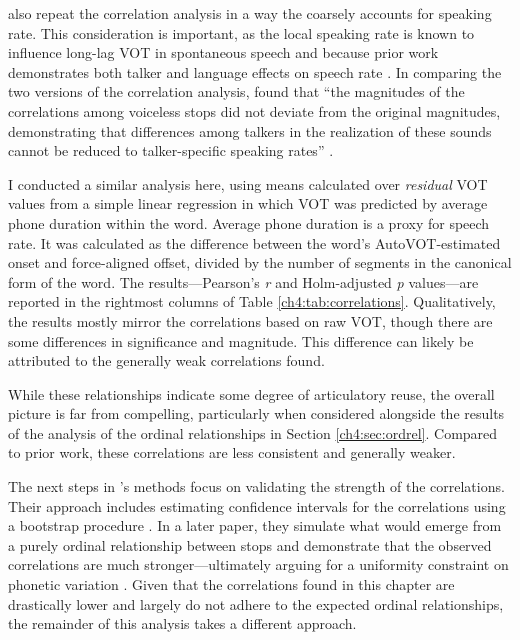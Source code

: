 \citet{chodroff_2017_structure} also repeat the correlation analysis in a way the coarsely accounts for speaking rate. This consideration is important, as the local speaking rate is known to influence long-lag VOT in spontaneous speech \citep{stuartsmith_2015_private} and because prior work demonstrates both talker and language effects on speech rate \citep{bradlow_2017_rate}. In comparing the two versions of the correlation analysis, \citeauthor{chodroff_2017_structure} found that ``the magnitudes of the correlations among voiceless stops did not deviate from the original magnitudes, demonstrating that differences among talkers in the realization of these sounds cannot be reduced to talker-specific speaking rates'' \citeyearpar[][p. 34]{chodroff_2017_structure}. 

I conducted a similar analysis here, using means calculated over \textit{residual} VOT values from a simple linear regression in which VOT was predicted by average phone duration within the word. Average phone duration is a proxy for speech rate. It was calculated as the difference between the word's AutoVOT-estimated onset and force-aligned offset, divided by the number of segments in the canonical form of the word. The results---Pearson's \textit{r} and Holm-adjusted \textit{p} values---are reported in the rightmost columns of Table \ref{ch4:tab:correlations}. Qualitatively, the results mostly mirror the correlations based on raw VOT, though there are some differences in significance and magnitude. This difference can likely be attributed to the generally weak correlations found. 

While these relationships indicate some degree of articulatory reuse, the overall picture is far from compelling, particularly when considered alongside the results of the analysis of the ordinal relationships in Section \ref{ch4:sec:ordrel}. Compared to prior work, these correlations are less consistent and generally weaker.

The next steps in \citeauthor{chodroff_2017_structure}'s \citeyearpar{chodroff_2017_structure} methods focus on validating the strength of the correlations. Their approach includes estimating confidence intervals for the correlations using a bootstrap procedure \citep{chodroff_2017_structure}. In a later paper, they simulate what would emerge from a purely ordinal relationship between stops and demonstrate that the observed correlations are much stronger—ultimately arguing for a uniformity constraint on phonetic variation \citep{chodroff_2019_covariation}. Given that the correlations found in this chapter are drastically lower and largely do not adhere to the expected ordinal relationships, the remainder of this analysis takes a different approach.

